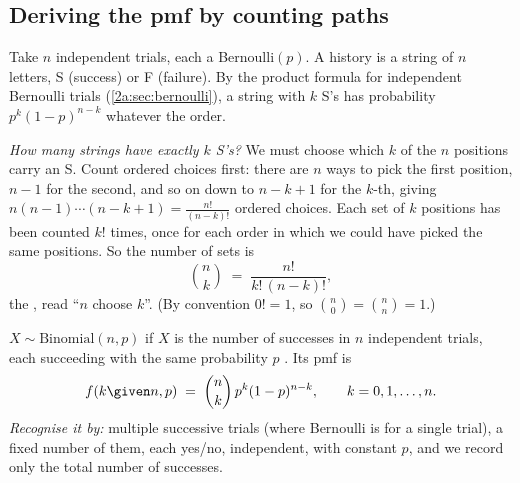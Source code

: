 \subsection{Deriving the pmf by counting paths}

Take $n$ independent trials, each a Bernoulli$(p)$. A history is a string of $n$ letters, S (success) or F (failure). By the product formula for independent Bernoulli trials (\cref{2a:sec:bernoulli}), a string with $k$ S's has probability $p^k(1-p)^{n-k}$ whatever the order.

\emph{How many strings have exactly $k$ S's?} We must choose which $k$ of the $n$ positions carry an S. Count ordered choices first: there are $n$ ways to pick the first position, $n-1$ for the second, and so on down to $n-k+1$ for the $k$-th, giving $n(n-1)\cdots(n-k+1)=\frac{n!}{(n-k)!}$ ordered choices. Each set of $k$ positions has been counted $k!$ times, once for each order in which we could have picked the same positions. So the number of sets is
\begin{equation}
  \binom nk \;=\; \frac{n!}{k!\,(n-k)!}, \label{2a:eq:binomcoef}
\end{equation}
the , read ``$n$ choose $k$''. (By convention $0!=1$, so $\binom n0=\binom nn=1$.)

\begin{workdef}
$X\sim\mathrm{Binomial}(n,p)$ if $X$ is the number of successes in $n$ independent trials, each succeeding with the same probability $p$ . Its pmf is
\begin{equation}
  f(k\given n,p)\;=\;\binom nk\,p^k(1-p)^{n-k},\qquad k=0,1,\dots,n. \label{2a:eq:binom}
\end{equation}
\emph{Recognise it by:} multiple successive trials (where Bernoulli is for a single trial), a fixed number of them, each yes/no, independent, with constant $p$, and we record only the total number of successes.
\end{workdef}

